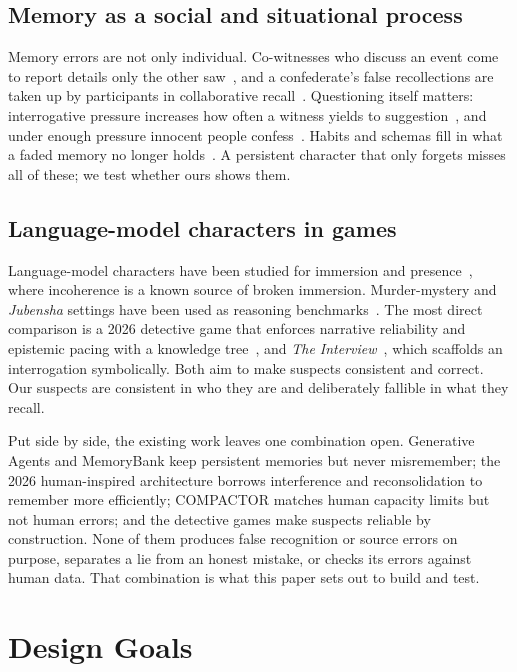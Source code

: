 \documentclass[conference]{IEEEtran}
\begin{document}
\subsection{Memory as a social and situational process}
Memory errors are not only individual. Co-witnesses who discuss an event come to report details only
the other saw~\cite{gabbert2003}, and a confederate's false recollections are taken up by
participants in collaborative recall~\cite{roediger2001social}. Questioning itself matters:
interrogative pressure increases how often a witness yields to suggestion~\cite{gudjonsson1984}, and
under enough pressure innocent people confess~\cite{kassin1996}. Habits and schemas fill in what
a faded memory no longer holds~\cite{bartlett1932}. A persistent character that only forgets misses
all of these; we test whether ours shows them.

\subsection{Language-model characters in games}
Language-model characters have been studied for immersion and presence~\cite{presence2024,
zargham2026}, where incoherence is a known source of broken immersion. Murder-mystery and
\emph{Jubensha} settings have been used as reasoning benchmarks~\cite{player2024,jubensha2023}. The
most direct comparison is a 2026 detective game that enforces narrative reliability and epistemic
pacing with a knowledge tree~\cite{detective2026}, and \emph{The Interview}~\cite{interview2025}, which
scaffolds an interrogation symbolically. Both aim to make suspects consistent and correct. Our
suspects are consistent in who they are and deliberately fallible in what they recall.

Put side by side, the existing work leaves one combination open. Generative Agents and
MemoryBank keep persistent memories but never misremember; the 2026 human-inspired architecture
borrows interference and reconsolidation to remember more efficiently; COMPACTOR matches human
capacity limits but not human errors; and the detective games make suspects reliable by
construction. None of them produces false recognition or source errors on purpose, separates a
lie from an honest mistake, or checks its errors against human data. That combination is what
this paper sets out to build and test.

\section{Design Goals}
\label{sec:goals}
\end{document}
